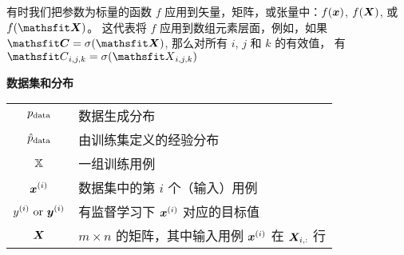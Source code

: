 有时我们把参数为标量的函数 $f$ 应用到矢量，矩阵，或张量中：$f({\bm{x}})$, $f({\bm{X}})$, 或 $f(\tX)$。
这代表将 $f$ 应用到数组元素层面，例如，如果 $\tC = \sigma(\tX)$, 那么对所有 $i$, $j$ 和 $k$ 的有效值，
有 $\etC_{i,j,k} = \sigma(\etX_{i,j,k})$


\vspace{\notationgap}
\begin{minipage}{\textwidth}
\centerline{\bf 数据集和分布}
\bgroup
\def\arraystretch{1.5}
\begin{tabular}{cp{3.25in}}
$\displaystyle p_{\rm{data}}$ & 数据生成分布\\
$\displaystyle \hat{p}_{\rm{data}}$ & 由训练集定义的经验分布\\
$\displaystyle {\mathbb{X}}$ & 一组训练用例\\
$\displaystyle {\bm{x}}^{(i)}$ & 数据集中的第 $i$ 个（输入）用例\\
$\displaystyle y^{(i)}\text{ or }{\bm{y}}^{(i)}$ & 有监督学习下 ${\bm{x}}^{(i)}$ 对应的目标值\\
$\displaystyle {\bm{X}}$ & $m \times n$ 的矩阵，其中输入用例 ${\bm{x}}^{(i)}$ 在 ${\bm{X}}_{i,:}$ 行\\
\end{tabular}
\egroup
\end{minipage}

\clearpage

